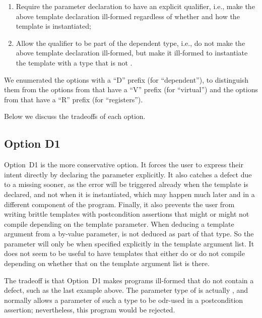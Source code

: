 \begin{enumerate}
\item Require the parameter declaration to have an explicit  qualifier, i.e., make the above template declaration ill-formed regardless of whether and how the template is instantiated;
\item Allow the  qualifier to be part of the dependent type, i.e., do not make the above template declaration ill-formed, but make it ill-formed to instantiate the template with a type that is not .
\end{enumerate}

We enumerated the options with a ``D'' prefix (for ``dependent''), to distinguish them from the options from \cite{D3484R1} that have a ``V'' prefix (for ``virtual'') and the options from \cite{D3487R0} that have a ``R'' prefix (for ``registers'').

Below we discuss the tradeoffs of each option.

\subsection*{Option D1}

Option~D1 is the more conservative option. It forces the user to express their intent directly by  declaring the parameter  explicitly. It also catches a defect due to a missing  sooner, as the error will be triggered already when the template is declared, and not when it is instantiated, which may happen much later and in a different component of the program. Finally, it also prevents the user from writing brittle templates with postcondition assertions that might or might not compile depending on the template parameter. When deducing a template argument from a by-value parameter,  is not deduced as part of that type. So the parameter will only be  when specified explicitly in the template argument list. It does not seem to be useful to have templates that either do or do not compile depending on whether that  on the template argument list is there.

The tradeoff is that Option~D1 makes programs ill-formed that do not contain a defect, such as the last example above. The parameter type of  is actually , and \cite{P2900R10} normally allows a parameter of such a type to be odr-used in a postcondition assertion; nevertheless, this program would be rejected.

